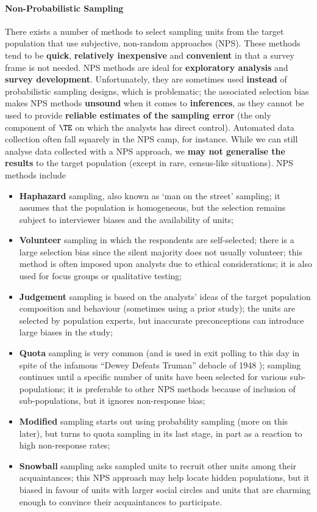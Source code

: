 \paragraph{Non-Probabilistic Sampling}
There exists a number of methods to select sampling units from the target population that use subjective, non-random approaches (NPS). These methods tend to be \textbf{quick}, \textbf{relatively inexpensive} and \textbf{convenient} in that a survey frame is not needed. NPS methods are ideal for \textbf{exploratory analysis} and \textbf{survey development}. \newl Unfortunately, they are sometimes used \textbf{instead} of probabilistic sampling designs, which is problematic; the associated selection bias makes NPS methods \textbf{unsound} when it comes to \textbf{inferences}, as they cannot be used to provide \textbf{reliable estimates of the sampling error} (the only component of $\TE$ on which the analysts has direct control). Automated data collection often fall squarely in the NPS camp, for instance. While we can still analyse data collected with a NPS approach, we \textbf{may not generalise the results} to the target  population (except in rare, census-like situations). \newl
NPS methods include
\begin{itemize}[noitemsep]
\item \textbf{Haphazard} sampling, also known as `man on the street' sampling; it assumes that the population is homogeneous, but the selection remains subject to interviewer biases and the availability of units;
\item \textbf{Volunteer} sampling in which the  respondents are self-selected; there is a large selection bias since the silent majority does not usually volunteer; this method is often imposed upon analysts due to ethical considerations; it is also used for focus groups or qualitative testing;
\item \textbf{Judgement} sampling is based on the analysts' ideas of the target population composition
 and behaviour (sometimes using a prior study); the units are selected by population experts, but inaccurate preconceptions can introduce large biases in the study;
\item \textbf{Quota} sampling is very common (and is used in exit polling to this day in spite of the infamous ``Dewey Defeats Truman'' debacle of 1948 \cite{DC_DDT}); sampling continues until a
 specific number of units have been selected for various sub-populations; it is preferable to
 other NPS methods because of inclusion of sub-populations, but it ignores non-response bias;
\item \textbf{Modified} sampling starts out using probability sampling (more on this later), but turns to quota sampling in its last stage, in part as a reaction to high non-response rates;
\item \textbf{Snowball} sampling asks sampled units to recruit other units among their acquaintances; this NPS approach may help locate hidden populations, but it biased in favour of units with larger social circles and units that are charming enough to convince their acquaintances to participate. 
\end{itemize}
